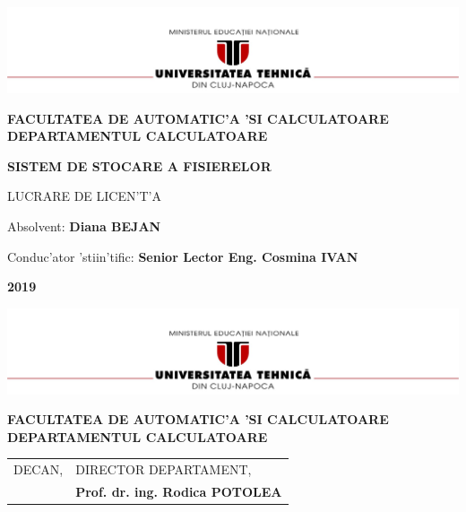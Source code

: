 \documentclass[12pt,a4paper,twoside]{report}
\renewcommand{\thesisauthor}{Diana BEJAN}    %
\renewcommand{\thesisyear}{2019}      %
\renewcommand{\thesistitle}{SISTEM DE STOCARE A FISIERELOR} %
\renewcommand{\thesissupervisor}{ Senior Lector Eng. Cosmina IVAN}
\newcommand{\department}{FACULTATEA DE AUTOMATIC'A 'SI CALCULATOARE\\
DEPARTAMENTUL CALCULATOARE}
\newcommand{\thesis}{LUCRARE DE LICEN'T'A}
\newcommand{\utcnlogo}{\includegraphics[width=15cm]{img/utcn.jpg}}
\begin{document}

\newenvironment{definition}[1][Defini'tie.]{\begin{trivlist}
\item[\hskip \labelsep {\bfseries #1}]}{\end{trivlist}}




\setcounter{page}{4}



\begin{center}
\utcnlogo

{\bf \department}

\vspace{4cm}

{\bf \thesistitle} %

\vspace{1.5cm}

\thesis

\vspace{6cm}

Absolvent: {\bf \thesisauthor} 

Conduc'ator 'stiin'tific: {\bf \thesissupervisor}

\vspace{3cm}
{\bf \thesisyear}
\end{center}

\thispagestyle{empty}
\newpage

\begin{center}
\utcnlogo

{\bf \department}
\end{center}
\vspace{0.5cm}

\begin{tabular}{p{7cm}p{8cm}}
 \hspace{-1cm}DECAN, & DIRECTOR DEPARTAMENT,\\
\hspace{-1cm}{\bf Prof. dr. ing. Liviu MICLEA} & {\bf Prof. dr. ing. Rodica POTOLEA}\\  
\end{tabular}
 
\end{document}
